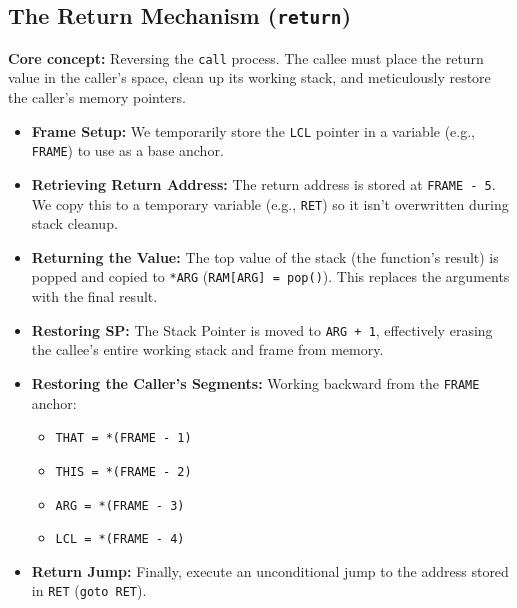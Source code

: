 \documentclass[12pt,a4paper]{article}
\begin{document}
\subsection{The Return Mechanism (\texttt{return})}
\textbf{Core concept:} Reversing the \texttt{call} process. The callee must place the return value in the caller's space, clean up its working stack, and meticulously restore the caller's memory pointers.
\begin{itemize}
    \item \textbf{Frame Setup:} We temporarily store the \texttt{LCL} pointer in a variable (e.g., \texttt{FRAME}) to use as a base anchor.
    \item \textbf{Retrieving Return Address:} The return address is stored at \texttt{FRAME - 5}. We copy this to a temporary variable (e.g., \texttt{RET}) so it isn't overwritten during stack cleanup.
    \item \textbf{Returning the Value:} The top value of the stack (the function's result) is popped and copied to \texttt{*ARG} (\texttt{RAM[ARG] = pop()}). This replaces the arguments with the final result.
    \item \textbf{Restoring SP:} The Stack Pointer is moved to \texttt{ARG + 1}, effectively erasing the callee's entire working stack and frame from memory.
    \item \textbf{Restoring the Caller's Segments:} Working backward from the \texttt{FRAME} anchor:
    \begin{itemize}
        \item \texttt{THAT = *(FRAME - 1)}
        \item \texttt{THIS = *(FRAME - 2)}
        \item \texttt{ARG = *(FRAME - 3)}
        \item \texttt{LCL = *(FRAME - 4)}
    \end{itemize}
    \item \textbf{Return Jump:} Finally, execute an unconditional jump to the address stored in \texttt{RET} (\texttt{goto RET}).
\end{itemize}
\end{document}
